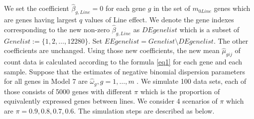 \documentclass[12pt, letter]{article}\usepackage[]{graphicx}\usepackage[]{color}
\begin{document}
We set the coefficient $\hat{\beta}_{g,Line} = 0$ for each gene $g$ in the set of $m_{0Line}$ genes which are genes having largest  $q$ values of Line effect. We denote the gene indexes corresponding to the new non-zero $\hat{\beta}_{g,Line}$ as $DEgenelist$ which is a subset of $Genelist :=\{1, 2, \dots, 12280\}$. Set $EEgenelist = Genelist\setminus DEgenelist$. The other coefficients are unchanged. Using those new coefficients, the new mean $\hat{\mu}_{gij}$  of count data  is calculated according to the formula \eqref{eq1} for each gene and each sample. Suppose that the estimates of negative binomial dispersion parameters for all genes in Model 7 are $\hat{\omega}_{g}, g = 1, \dots, m$ . We simulate 100 data sets, each of those consists of 5000 genes with different  $\pi$  which is the proportion of equivalently expressed  genes between lines. We consider 4 scenarios of $\pi$ which are $ \pi = 0.9, 0.8, 0.7, 0.6$. The simulation steps  are described as below. 
\end{document}
